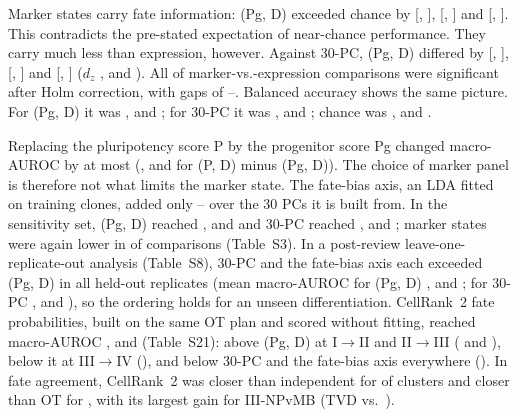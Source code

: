 \documentclass[10pt,journal,compsoc]{IEEEtran}
\begin{document}
Marker states carry fate information: (Pg, D) exceeded chance by \rqThreeDPgChanceOne{}
[\rqThreeDPgChanceLoOne, \rqThreeDPgChanceHiOne], \rqThreeDPgChanceTwo{}
[\rqThreeDPgChanceLoTwo, \rqThreeDPgChanceHiTwo] and \rqThreeDPgChanceThree{}
[\rqThreeDPgChanceLoThree, \rqThreeDPgChanceHiThree]. This contradicts the pre-stated
expectation of near-chance performance. They carry much less than expression, however.
Against 30-PC, (Pg, D) differed by \rqThreeDPgPCOne{} [\rqThreeDPgPCLoOne,
\rqThreeDPgPCHiOne], \rqThreeDPgPCTwo{} [\rqThreeDPgPCLoTwo, \rqThreeDPgPCHiTwo] and
\rqThreeDPgPCThree{} [\rqThreeDPgPCLoThree, \rqThreeDPgPCHiThree] ($d_z$
\rqThreeDzPgPCOne, \rqThreeDzPgPCTwo{} and \rqThreeDzPgPCThree). All
\rqThreeMarkerNSig{} of \rqThreeMarkerN{} marker-vs.-expression comparisons were
significant after Holm correction, with gaps of \rqThreeMarkerGapMin--\rqThreeMarkerGapMax.
Balanced accuracy shows the same picture. For (Pg, D) it was \rqThreeBaccPgDOne,
\rqThreeBaccPgDTwo{} and \rqThreeBaccPgDThree; for 30-PC it was \rqThreeBaccPCOne,
\rqThreeBaccPCTwo{} and \rqThreeBaccPCThree; chance was \rqThreeChanceBaccOne,
\rqThreeChanceBaccTwo{} and \rqThreeChanceBaccThree.

Replacing the pluripotency score P by the progenitor score Pg changed macro-AUROC by at
most \rqThreePDPgMaxAbs{} (\rqThreeDPDPgOne, \rqThreeDPDPgTwo{} and \rqThreeDPDPgThree{} for (P, D) minus
(Pg, D)). The choice of marker panel is therefore not what limits the marker state. The
fate-bias axis, an LDA fitted on training clones, added only
\rqThreePCFateMin--\rqThreePCFateMax{} over the 30 PCs it is built from. In the
sensitivity set, (Pg, D) reached \rqThreeSensAUCPgDOne, \rqThreeSensAUCPgDTwo{} and
\rqThreeSensAUCPgDThree{} and 30-PC reached \rqThreeSensAUCPCOne, \rqThreeSensAUCPCTwo{}
and \rqThreeSensAUCPCThree; marker states were again lower in \rqThreeSensMarkerNSig{} of
\rqThreeMarkerN{} comparisons (Table~S3). In a post-review leave-one-replicate-out analysis
(Table~S8), 30-PC and the fate-bias axis each exceeded (Pg, D) in all \loroNFolds{}
held-out replicates (mean macro-AUROC for (Pg, D)
\loroPgDOne, \loroPgDTwo{} and \loroPgDThree; for 30-PC \loroPCOne, \loroPCTwo{} and
\loroPCThree), so the ordering holds for an unseen differentiation. CellRank~2 fate
probabilities, built on the same OT plan and scored without fitting, reached macro-AUROC
\crAUROCOne, \crAUROCTwo{} and \crAUROCThree{} (Table~S21): above (Pg, D) at I$\to$II and
II$\to$III (\crVsPgDOne{} and \crVsPgDTwo), below it at III$\to$IV (\crVsPgDThree), and below
30-PC and the fate-bias axis everywhere (\crVsPCFate). In fate agreement, CellRank~2 was
closer than independent for \crFateNBetterInd{} of \crFateN{} clusters and closer than OT
for \crFateNBetterOT, with its largest gain for III-NPvMB (TVD \crTvdNPvMB{} vs.\
\tvdOTThreeNPvMB).
\end{document}
